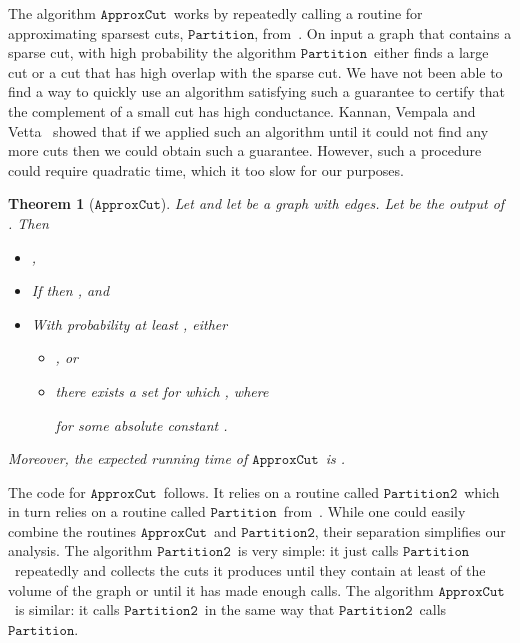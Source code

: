 \documentclass[11pt]{article}
\newtheorem{theorem}{Theorem}[section]
\newcommand{\approxcut}{\ensuremath{\mathtt{ApproxCut}}}
\newcommand{\partition}{\ensuremath{\mathtt{Partition}}}
\newcommand{\partitiontwo}{\ensuremath{\mathtt{Partition2}}}
\begin{document}
The algorithm \approxcut \ works by repeatedly calling a routine
  for approximating sparsest cuts, \partition, from~\cite{SpielmanTengCuts}.
On input a graph that contains a sparse cut, with high probability
  the algorithm \partition \ either finds a large cut or a cut that has high overlap
  with the sparse cut.
We have not been able to find a way to quickly
   use an algorithm satisfying such a guarantee
  to certify that the complement of a small cut has high conductance.
Kannan, Vempala and Vetta~\cite{KannanVempalaVetta} showed that if we applied
  such an algorithm until it could not find any more cuts then we
  could obtain such a guarantee.
However, such a procedure could require quadratic time, which it too
  slow for our purposes.

\begin{theorem}[\approxcut]\label{thm:ApproxCut}
Let  and let  be a graph with  edges.
Let  be the output of .
Then
\begin{itemize}
\item [(A.1)] ,
\item [(A.2)] If  then , and
\item [(A.3)] With probability at least , either
\begin{itemize}
\item [(A.3.a)] , or
\item [(A.3.b)] there exists a set  for which
  , where

for some absolute constant .
\end{itemize}
\end{itemize}
Moreover, the expected running time of \approxcut\  is 
  .
\end{theorem}

The code for \approxcut\ follows.
It relies on a routine called \partitiontwo\, which in turn relies on a routine called
  \partition\ from~\cite{SpielmanTengCuts}.
While one could easily combine the routines \approxcut \ and \partitiontwo ,
  their separation simplifies our analysis.
The algorithm \partitiontwo \ is very simple: it just calls 
  \partition \ repeatedly and collects the cuts it produces until they
  contain at least  of the volume of the graph or until it has
  made enough calls.
The algorithm \approxcut \ is similar: it calls \partitiontwo \ in the
  same way that \partitiontwo \ calls \partition .
  
\vskip 0.2in
\noindent
{}
\vskip 0.2in
\end{document}
